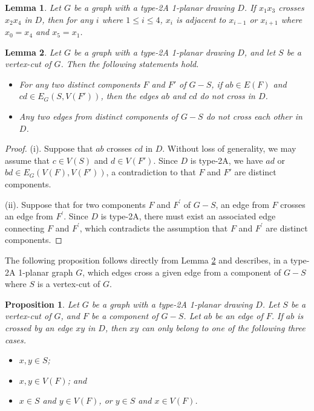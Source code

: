 \documentclass[12pt,a4paper]{article}
\newtheorem{prop}{Proposition}[section]
\newtheorem{lem}{Lemma}[section]
\begin{document}
\begin{lem}\label{lem:localcrossing}
Let $G$ be a graph with a type-2A 1-planar drawing $D$. If $x_1x_3$ crosses $x_2x_4$ in $D$, then for any $i$ where $1\le i\le 4$, $x_i$ is adjacent to $x_{i-1}$ or $x_{i+1}$ where $x_0=x_4$ and $x_5=x_1$.
\end{lem}





\begin{lem}\label{lem:componentsuncrossed}
Let $G$ be a graph with a type-2A 1-planar drawing $D$, and let $S$ be a vertex-cut of $G$. Then the following statements hold.

\begin{itemize}
  \item [(i)] For any two distinct components $F$ and $F'$ of $G-S$, if $ab \in E(F)$ and $cd \in E_G(S, V(F'))$, then the edges $ab$ and $cd$ do not cross in  $D$.
  \item [(ii)] Any two edges from distinct components of  $G-S$ do not cross each other in $D$. 
\end{itemize}

\end{lem}
\begin{proof}

(i). Suppose that $ab$ crosses $cd$ in $D$. Without loss of generality, we may assume that $c \in V(S)$ and $d\in V(F')$.   Since $D$ is type-2A, we have $ad$ or $ bd \in E_G(V(F),V(F')) $, a contradiction to  that $F$ and $F'$ are distinct components.

(ii). Suppose that for two components $F$ and $F^{\prime}$ of $G-S$, an edge from $F$ crosses an edge from $F^{\prime}$. Since $D$ is type-2A, there must exist an associated edge connecting $F$ and $F^{\prime}$, which contradicts the assumption that $F$ and $F^{\prime}$ are distinct components.
\end{proof}

The following proposition follows directly from Lemma \ref{lem:componentsuncrossed} and describes, in a type-2A 1-planar graph $G$, which edges cross a given edge from a  component of $G-S$ where $S$ is a vertex-cut of $G$.
\begin{prop}\label{lem:crosing}
Let $G$ be a graph with a type-2A 1-planar drawing $D$. Let $S$ be a vertex-cut of $G$, and $F$ be a component of $G - S$. Let $ab$ be an edge of $F$. If $ab$ is crossed by an edge $xy$ in $D$, then $xy$ can only belong to one of the following three cases.
\begin{itemize}
  \item [(a)]  $x,y \in S$;
  \item [(b)]  $x,y \in V(F)$; and
 \item [(c)] $x\in S$ and $y\in V(F)$, or  $y\in S$ and $x\in V(F)$.
\end{itemize}
\end{prop}
\end{document}
